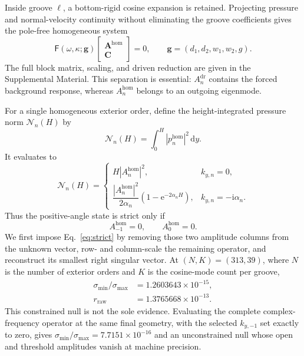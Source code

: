 \documentclass[aps,prl,reprint,superscriptaddress,nofootinbib]{revtex4-2}
\newcommand{\ii}{\mathrm{i}}
\newcommand{\e}{\mathrm{e}}
\providecommand{\hom}{\mathrm{hom}}
\providecommand{\dr}{\mathrm{dr}}
\begin{document}
Inside groove $\ell$, a bottom-rigid cosine expansion is retained.  Projecting
pressure and normal-velocity continuity without eliminating the groove
coefficients gives the pole-free homogeneous system
\begin{equation}
 \mathsf F(\omega,\kappa;\bm g)
 \begin{bmatrix}\bm A^{\hom}\\ \bm C\end{bmatrix}=0,
 \qquad \bm g=(d_1,d_2,w_1,w_2,g).                                      \label{eq:operator}
\end{equation}
The full block matrix, scaling, and driven reduction are given in the
Supplemental Material.  This separation is essential: $A_n^{\dr}$ contains
the forced background response, whereas $A_n^{\hom}$ belongs to an outgoing
eigenmode.

For a single homogeneous exterior order, define the height-integrated
pressure norm $\mathcal N_n(H)$ by
\begin{equation}
 \mathcal N_n(H)=\int_0^H |p_n^{\hom}|^2\,\mathrm{d}y.
 \label{eq:norm-definition}
\end{equation}
It evaluates to
\begin{equation}
 \mathcal N_n(H)=
 \begin{cases}
 H|A_n^{\hom}|^2,&k_{y,n}=0,\\[2pt]
 \dfrac{|A_n^{\hom}|^2}{2\alpha_n}
 (1-\e^{-2\alpha_nH}),&k_{y,n}=-\ii\alpha_n.
 \end{cases}                                                            \label{eq:norm}
\end{equation}
Thus the positive-angle state is strict only if
\begin{equation}
 A_{-1}^{\hom}=0,\qquad A_0^{\hom}=0.                                   \label{eq:strict}
\end{equation}
We first impose Eq.~\eqref{eq:strict} by removing those two amplitude columns
from the unknown vector, row- and column-scale the remaining operator, and
reconstruct its smallest right singular vector.  At $(N,K)=(313,39)$,
where $N$ is the number of exterior orders and $K$ is the cosine-mode count
per groove,
\begin{align}
 \sigma_{\min}/\sigma_{\max}&=1.2603643\times10^{-15},\nonumber\\
 r_{\mathrm{raw}}&=1.3765668\times10^{-13}.                         \label{eq:residual}
\end{align}
This constrained null is not the sole evidence.  Evaluating the complete
complex-frequency operator at the same final geometry, with the selected
$k_{y,-1}$ set exactly to zero, gives
$\sigma_{\min}/\sigma_{\max}=7.7151\times10^{-16}$ and an unconstrained null
whose open and threshold amplitudes vanish at machine precision.
\end{document}

